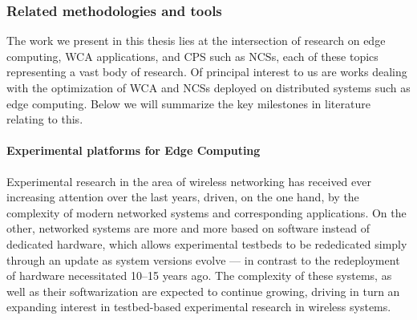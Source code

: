
\subsubsection{Related methodologies and tools}

The work we present in this thesis lies at the intersection of research on edge computing, \gls{WCA} applications, and \acl{CPS} such as \glspl{NCS}, each of these topics representing a vast body of research.
Of principal interest to us are works dealing with the optimization of \gls{WCA} and \glspl{NCS} deployed on distributed systems such as edge computing.
Below we will summarize the key milestones in literature relating to this.

\paragraph{Experimental platforms for Edge Computing}

Experimental research in the area of wireless networking has received ever increasing attention over the last years, driven, on the one hand, by the complexity of modern networked systems and corresponding applications.
On the other, networked systems are more and more based on software instead of dedicated hardware, which allows experimental testbeds to be rededicated simply through an update as system versions evolve --- in contrast to the redeployment of hardware necessitated \numrange[range-phrase={--}]{10}{15} years ago.
The complexity of these systems, as well as their softwarization are expected to continue growing, driving in turn an expanding interest in testbed-based experimental research in wireless systems.

